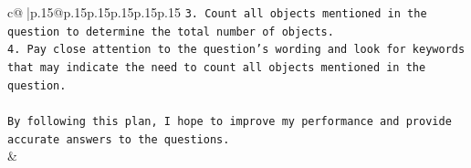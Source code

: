 \documentclass{article}
\begin{document}
{\begin{supertabular}{c@{$\;$}|p{.15\linewidth}@{}p{.15\linewidth}p{.15\linewidth}p{.15\linewidth}p{.15\linewidth}p{.15\linewidth}}
{{{\texttt{3. Count all objects mentioned in the question to determine the total number of objects.} \\
\texttt{4. Pay close attention to the question's wording and look for keywords that may indicate the need to count all objects mentioned in the question.} \\
\\ 
\texttt{By following this plan, I hope to improve my performance and provide accurate answers to the questions.} \\
            }
        }
    }
    & \\ \\

\end{supertabular}
}
\end{document}
